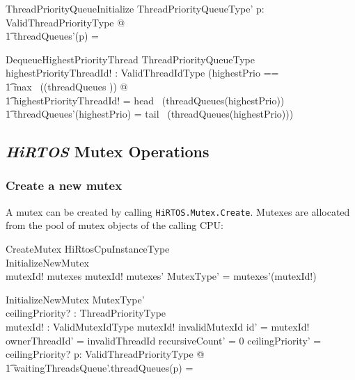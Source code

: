 \documentclass[11pt,letterpaper,twoside,openany]{book}
\begin{document}
\begin{schema}{ThreadPriorityQueueInitialize}
   ThreadPriorityQueueType'
\where
   \forall p: ValidThreadPriorityType @ \\
\t1     threadQueues'(p) = \emptyset
\end{schema}

\begin{schema}{DequeueHighestPriorityThread}
   \Delta ThreadPriorityQueueType \\
   highestPriorityThreadId! : ValidThreadIdType
\where
   (\LET highestPrio == \\
   \t1 max~ (\dom (threadQueues \nrres \emptyset)) @ \\
   \t1 highestPriorityThreadId! = head~ (threadQueues(highestPrio)) \land \\
   \t1 threadQueues'(highestPrio) = tail~ (threadQueues(highestPrio)))
\end{schema}

\subsection{\emph{HiRTOS} Mutex Operations}

\subsubsection{Create a new mutex}

A mutex can be created by calling \verb`HiRTOS.Mutex.Create`. Mutexes are allocated from the pool of
mutex objects of the calling CPU:

\begin{schema}{CreateMutex}
   \Delta HiRtosCpuInstanceType \\
   InitializeNewMutex \\
\where
   mutexId! \notin \dom mutexes
\also
   mutexId! \in \dom mutexes'
\also
   \theta MutexType' = mutexes'(mutexId!)
\end{schema}

\begin{schema}{InitializeNewMutex}
   MutexType' \\
   ceilingPriority? : ThreadPriorityType \\
   mutexId! : ValidMutexIdType
\where
   mutexId! \neq invalidMutexId
\also
   id' = mutexId!
\also
   ownerThreadId' = invalidThreadId
\also
   recursiveCount' = 0
\also
   ceilingPriority' = ceilingPriority?
\also
   \forall p: ValidThreadPriorityType @ \\
\t1      waitingThreadsQueue'.threadQueues(p) = \emptyset
\end{schema}
\end{document}
